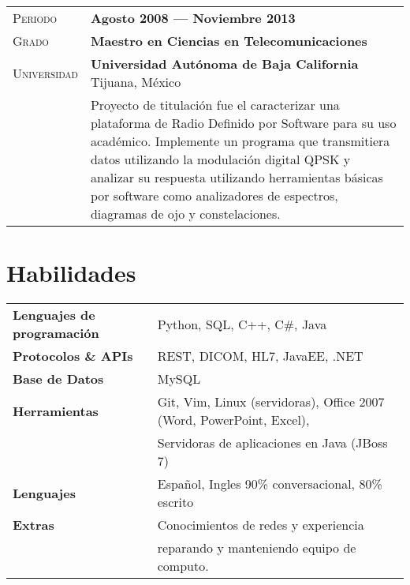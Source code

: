 \documentclass[letter, oneside, final]{scrartcl} %
\newcommand{\gray}{\rowcolor[gray]{.90}} %
\begin{document}
\begin{center}
\vspace{12pt}

\begin{tabularx}{0.97\linewidth}{>{\raggedleft\scshape}p{2cm}X}
\gray Periodo & \textbf{Agosto 2008 --- Noviembre 2013}\\
\gray Grado & \textbf{Maestro en Ciencias en Telecomunicaciones}\\
\gray Universidad & \textbf{Universidad Autónoma de Baja California} \hfill Tijuana, México\\
& Proyecto de titulación fue el caracterizar una plataforma de Radio Definido por Software para su uso académico. Implemente un programa que transmitiera datos utilizando la modulación digital QPSK y analizar su respuesta utilizando herramientas básicas por software como analizadores de espectros, diagramas de ojo y constelaciones.
\end{tabularx}


\section{Habilidades}

\begin{tabular}{ @{} >{\bfseries}l @{\hspace{6ex}} l }
Lenguajes de programación & Python, SQL, C++, C\#, Java \\
Protocolos \& APIs & REST, DICOM, HL7, JavaEE, .NET \\
Base de Datos & MySQL \\
Herramientas & Git, Vim, Linux (servidoras), Office 2007 (Word, PowerPoint, Excel),\\
& Servidoras de aplicaciones en Java (JBoss 7) \\
Lenguajes & Español, Ingles 90\% conversacional, 80\% escrito\\
Extras & Conocimientos de redes y experiencia\\
& reparando y manteniendo equipo de computo.
\end{tabular}



\end{center}
\end{document}
